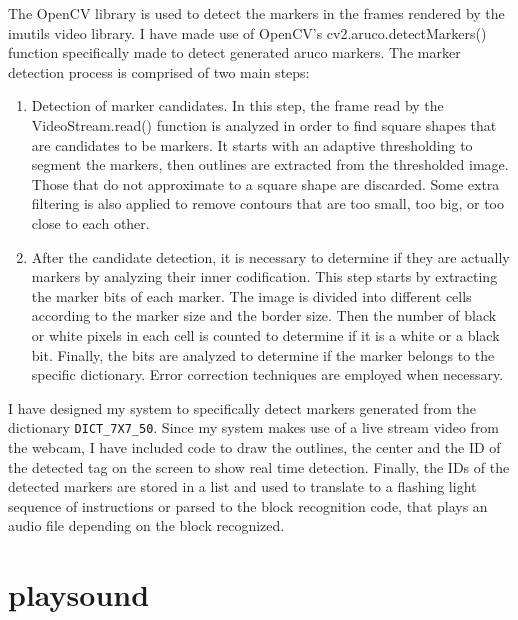 \documentclass[oneside,%
                    author={Malak Hajji},
                    degree={BSc},
                    title={Designing An Accessible Ozobot Programming Platform for Students},
                  subtitle={With Mixed Visual Abilities}]{dissertation}
\begin{document}
The OpenCV library is used to detect the markers in the frames rendered by the imutils video library. I have made use of OpenCV’s cv2.aruco.detectMarkers() function specifically made to detect generated aruco markers. The marker detection process is comprised of two main steps:
\begin{enumerate}
    \item Detection of marker candidates. In this step, the frame read by the VideoStream.read() function  is analyzed in order to find square shapes that are candidates to be markers. It starts with an adaptive thresholding to segment the markers, then outlines are extracted from the thresholded image. Those that do not approximate to a square shape are discarded. Some extra filtering is also applied to remove contours that are too small, too big, or too close to each other.
    \item After the candidate detection, it is necessary to determine if they are actually markers by analyzing their inner codification. This step starts by extracting the marker bits of each marker. The image is divided into different cells according to the marker size and the border size. Then the number of black or white pixels in each cell is counted to determine if it is a white or a black bit. Finally, the bits are analyzed to determine if the marker belongs to the specific dictionary. Error correction techniques are employed when necessary.
\end{enumerate}
I have designed my system to specifically detect markers generated from the dictionary \texttt{DICT\_7X7\_50}. Since my system makes use of a live stream video from the webcam, I have included code to draw the outlines, the center and the ID of the detected tag on the screen to show real time detection. 
Finally, the IDs of the detected markers are stored in a list and used to translate to a flashing light sequence of instructions or parsed to the block recognition code, that plays an audio file depending on the block recognized.

\section{playsound}
\end{document}
